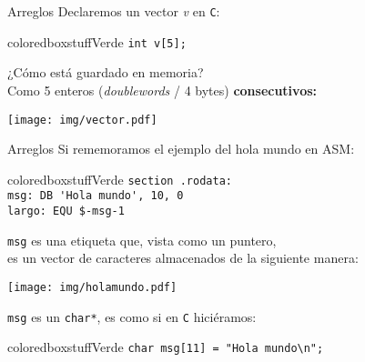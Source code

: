 \documentclass[aspectratio=169]{beamer}
\begin{document}
\begin{frame}[fragile]{Arreglos}
    Declaremos un vector \textit{v} en \texttt{C}:\\
    \bigskip
    \pause
    \begin{beamercolorbox}[wd=0.9\textwidth,sep=0.5em]{coloredboxstuffVerde}
    \verb|int v[5];|
    \end{beamercolorbox}
    \bigskip
    ¿Cómo está guardado en memoria?\\
    \bigskip
    \pause
    Como 5 enteros (\textit{doublewords} / 4 bytes) \textbf{consecutivos:}\\
    \bigskip
    \begin{center}
    \texttt{[image: img/vector.pdf]}
    \end{center}
\end{frame}

\begin{frame}[fragile]{Arreglos}
    Si rememoramos el ejemplo del hola mundo en ASM:\\
    \bigskip
    \begin{beamercolorbox}[wd=0.9\textwidth,sep=0.5em]{coloredboxstuffVerde}
    \verb|section .rodata:|\\
    \verb|msg: DB 'Hola mundo', 10, 0|\\
    \verb|largo: EQU $-msg-1|
    \end{beamercolorbox}
    \bigskip
    \pause
    \texttt{msg} es una etiqueta que, vista como un puntero,\\ es un vector de caracteres almacenados de la siguiente manera:
    
    \begin{center}
    \texttt{[image: img/holamundo.pdf]}
    \end{center}
    \pause
    \small \texttt{msg} es un \texttt{char*}, es como si en \texttt{C} hiciéramos:\\
    \small
    \begin{beamercolorbox}[wd=0.9\textwidth,sep=0.5em]{coloredboxstuffVerde}
    \verb|char msg[11] = "Hola mundo\n";|
    \end{beamercolorbox}
\end{frame}
\end{document}
